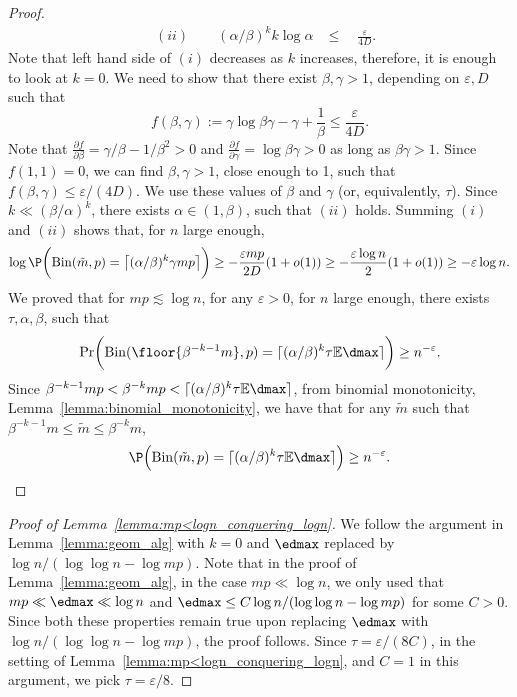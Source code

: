 \begin{proof}
\begin{equation*}
\begin{aligned}
        &(ii) \qquad (\alpha/\beta)^k k \log \alpha & \leq \quad \frac{\varepsilon}{4D}.
    \end{aligned}
\end{equation*}
Note that left hand side of \((i)\) decreases as \(k\) increases, therefore, it is enough to look at \(k = 0\). We need to show that there exist \(\beta, \gamma > 1\), depending on \(\varepsilon, D\) such that
\begin{equation*}
    f(\beta, \gamma) := \gamma \log \beta \gamma - \gamma + \frac{1}{\beta} \leq \frac{\varepsilon}{4D}.
\end{equation*}
Note that \(\frac{\partial f}{\partial \beta} = \gamma / \beta - 1 / \beta^2 > 0\) and \(\frac{\partial f}{\partial \gamma} = \log \beta \gamma > 0\) as long as \(\beta \gamma > 1\). Since \(f(1, 1) = 0\), we can find \(\beta, \gamma > 1\), close enough to 1, such that \(f(\beta, \gamma) \leq \varepsilon / (4D)\).
We use these values of \(\beta\) and \(\gamma\) (or, equivalently, \(\tau\)). Since \(k \ll (\beta / \alpha)^k\), there exists \(\alpha \in (1, \beta)\), such that \((ii)\) holds. Summing \((i)\) and \((ii)\) shows that, for \(n\) large enough,
\begin{equation*}
    \log \P\biggl(\mathrm{Bin}(\tilde m, p) = \bigl\lceil (\alpha / \beta)^k \gamma mp\bigr\rceil \biggr) \geq - \frac{\varepsilon mp}{2D}(1 + o(1)) \geq - \frac{\varepsilon \log n}{2} (1+o(1)) \geq -\varepsilon \log n.
\end{equation*}
    We proved that for \(mp \lesssim \log n\), for any \(\varepsilon > 0\), for \(n\) large enough, there exists \(\tau, \alpha, \beta\), such that
       \begin{equation*}
        \mathrm{Pr}\biggl(\mathrm{Bin}(\floor {\beta^{-k-1} m}, p) = \lceil(\alpha/\beta)^k \tau \mathbb{E}\dmax\rceil \biggr) \geq n^{-\varepsilon}.
    \end{equation*}
    Since \(\beta^{-k-1}mp < \beta^{-k}mp < \lceil(\alpha/\beta)^k \tau \mathbb{E}\dmax\rceil\), from binomial monotonicity, Lemma~\ref{lemma:binomial_monotonicity}, we have that for any \(\tilde m\) such that \(\beta^{-k - 1} m \leq \tilde m \leq \beta^{-k} m\),
    \begin{equation*}
    \P\Bigl(\mathrm{Bin}(\tilde m, p) = \lceil(\alpha / \beta)^k \tau \mathbb{E}\dmax\rceil \Bigr) \geq n^{-\varepsilon}.
    \end{equation*}

\end{proof}
\begin{proof}[Proof of Lemma~\ref{lemma:mp<logn_conquering_logn}]
We follow the argument in Lemma~\ref{lemma:geom_alg} with \(k = 0\) and \(\edmax\) replaced by \(\log n / (\log \log n - \log mp)\). Note that in the proof of Lemma~\ref{lemma:geom_alg}, in the case \(mp \ll \log n\), we only used that \(mp \ll \edmax \ll \log n\) and \(\edmax \leq C \log n / (\log \log n - \log mp)\) for some \(C > 0\). Since both these properties remain true upon replacing \(\edmax\) with \(\log n / (\log \log n - \log mp)\), the proof follows. Since \(\tau = \varepsilon / (8C)\), in the setting of Lemma~\ref{lemma:mp<logn_conquering_logn}, and \(C = 1\) in this argument, we pick \(\tau = \varepsilon / 8\).
\end{proof}
